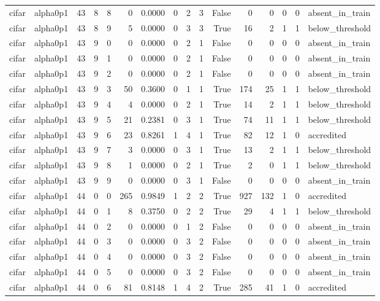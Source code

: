 \begin{tabular}{llrrrrrrrrrrrrrl}
cifar & alpha0p1 & 43 & 8 & 8 & 0 & 0.0000 & 0 & 2 & 3 & False & 0 & 0 & 0 & 0 & absent\_in\_train \\
cifar & alpha0p1 & 43 & 8 & 9 & 5 & 0.0000 & 0 & 3 & 3 & True & 16 & 2 & 1 & 1 & below\_threshold \\
cifar & alpha0p1 & 43 & 9 & 0 & 0 & 0.0000 & 0 & 2 & 1 & False & 0 & 0 & 0 & 0 & absent\_in\_train \\
cifar & alpha0p1 & 43 & 9 & 1 & 0 & 0.0000 & 0 & 2 & 1 & False & 0 & 0 & 0 & 0 & absent\_in\_train \\
cifar & alpha0p1 & 43 & 9 & 2 & 0 & 0.0000 & 0 & 2 & 1 & False & 0 & 0 & 0 & 0 & absent\_in\_train \\
cifar & alpha0p1 & 43 & 9 & 3 & 50 & 0.3600 & 0 & 1 & 1 & True & 174 & 25 & 1 & 1 & below\_threshold \\
cifar & alpha0p1 & 43 & 9 & 4 & 4 & 0.0000 & 0 & 2 & 1 & True & 14 & 2 & 1 & 1 & below\_threshold \\
cifar & alpha0p1 & 43 & 9 & 5 & 21 & 0.2381 & 0 & 3 & 1 & True & 74 & 11 & 1 & 1 & below\_threshold \\
cifar & alpha0p1 & 43 & 9 & 6 & 23 & 0.8261 & 1 & 4 & 1 & True & 82 & 12 & 1 & 0 & accredited \\
cifar & alpha0p1 & 43 & 9 & 7 & 3 & 0.0000 & 0 & 3 & 1 & True & 13 & 2 & 1 & 1 & below\_threshold \\
cifar & alpha0p1 & 43 & 9 & 8 & 1 & 0.0000 & 0 & 2 & 1 & True & 2 & 0 & 1 & 1 & below\_threshold \\
cifar & alpha0p1 & 43 & 9 & 9 & 0 & 0.0000 & 0 & 3 & 1 & False & 0 & 0 & 0 & 0 & absent\_in\_train \\
cifar & alpha0p1 & 44 & 0 & 0 & 265 & 0.9849 & 1 & 2 & 2 & True & 927 & 132 & 1 & 0 & accredited \\
cifar & alpha0p1 & 44 & 0 & 1 & 8 & 0.3750 & 0 & 2 & 2 & True & 29 & 4 & 1 & 1 & below\_threshold \\
cifar & alpha0p1 & 44 & 0 & 2 & 0 & 0.0000 & 0 & 1 & 2 & False & 0 & 0 & 0 & 0 & absent\_in\_train \\
cifar & alpha0p1 & 44 & 0 & 3 & 0 & 0.0000 & 0 & 3 & 2 & False & 0 & 0 & 0 & 0 & absent\_in\_train \\
cifar & alpha0p1 & 44 & 0 & 4 & 0 & 0.0000 & 0 & 3 & 2 & False & 0 & 0 & 0 & 0 & absent\_in\_train \\
cifar & alpha0p1 & 44 & 0 & 5 & 0 & 0.0000 & 0 & 3 & 2 & False & 0 & 0 & 0 & 0 & absent\_in\_train \\
cifar & alpha0p1 & 44 & 0 & 6 & 81 & 0.8148 & 1 & 4 & 2 & True & 285 & 41 & 1 & 0 & accredited \\

\end{tabular}
